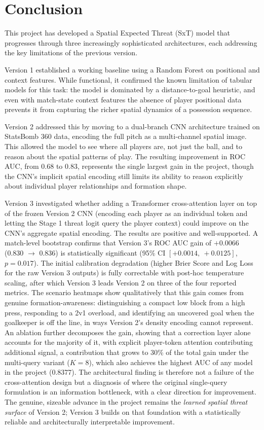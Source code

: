 \chapter{Conclusion}\label{ch:conclusion}

This project has developed a Spatial Expected Threat (SxT) model that progresses through three increasingly sophisticated architectures, each addressing the key limitations of the previous version.

Version 1 established a working baseline using a Random Forest on positional and context features. While functional, it confirmed the known limitation of tabular models for this task: the model is dominated by a distance-to-goal heuristic, and even with match-state context features the absence of player positional data prevents it from capturing the richer spatial dynamics of a possession sequence.

Version 2 addressed this by moving to a dual-branch CNN architecture trained on StatsBomb 360 data, encoding the full pitch as a multi-channel spatial image. This allowed the model to see where all players are, not just the ball, and to reason about the spatial patterns of play. The resulting improvement in ROC AUC, from 0.68 to 0.83, represents the single largest gain in the project, though the CNN's implicit spatial encoding still limits its ability to reason explicitly about individual player relationships and formation shape.

Version 3 investigated whether adding a Transformer cross-attention layer on top of the frozen Version 2 CNN (encoding each player as an individual token and letting the Stage 1 threat logit query the player context) could improve on the CNN's aggregate spatial encoding. The results are positive and well-supported. A match-level bootstrap confirms that Version 3's ROC AUC gain of $+0.0066$ (0.830 $\to$ 0.836) is statistically significant (95\% CI $[+0.0014,\ +0.0125]$, $p = 0.017$). The initial calibration degradation (higher Brier Score and Log Loss for the raw Version 3 outputs) is fully correctable with post-hoc temperature scaling, after which Version 3 leads Version 2 on three of the four reported metrics. The scenario heatmaps show qualitatively that this gain comes from genuine formation-awareness: distinguishing a compact low block from a high press, responding to a 2v1 overload, and identifying an uncovered goal when the goalkeeper is off the line, in ways Version 2's density encoding cannot represent. An ablation further decomposes the gain, showing that a correction layer alone accounts for the majority of it, with explicit player-token attention contributing additional signal, a contribution that grows to 30\% of the total gain under the multi-query variant ($K=8$), which also achieves the highest AUC of any model in the project (0.8377). The architectural finding is therefore not a failure of the cross-attention design but a diagnosis of where the original single-query formulation is an information bottleneck, with a clear direction for improvement. The genuine, sizeable advance in the project remains the \emph{learned spatial threat surface} of Version 2; Version 3 builds on that foundation with a statistically reliable and architecturally interpretable improvement.

